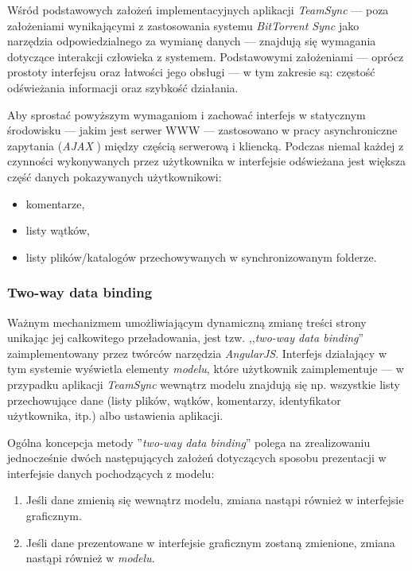 Wśród podstawowych założeń implementacyjnych aplikacji \emph{TeamSync} --- poza założeniami wynikającymi z zastosowania systemu \emph{BitTorrent Sync} jako narzędzia odpowiedzialnego za wymianę danych --- znajdują się wymagania dotyczące interakcji człowieka z systemem. Podstawowymi założeniami --- oprócz prostoty interfejsu oraz łatwości jego obsługi --- w tym zakresie są: częstość odświeżania informacji oraz szybkość działania.

Aby sprostać powyższym wymaganiom i zachować interfejs w statycznym środowisku --- jakim jest serwer WWW --- zastosowano w pracy asynchroniczne zapytania (\emph{AJAX} \cite{ajax}) między częścią serwerową i kliencką. Podczas niemal każdej z czynności wykonywanych przez użytkownika w interfejsie odświeżana jest większa część danych pokazywanych użytkownikowi:

\begin{itemize}[noitemsep]
  \item komentarze,
  \item listy wątków,
  \item listy plików/katalogów przechowywanych w synchronizowanym folderze.
\end{itemize}

\subsubsection*{Two-way data binding}

Ważnym mechanizmem umożliwiającym dynamiczną zmianę treści strony unikając jej całkowitego przeładowania, jest tzw. ,,\emph{two-way data binding}'' zaimplementowany przez twórców narzędzia \emph{AngularJS}. Interfejs działający w tym systemie wyświetla elementy \emph{modelu}, które użytkownik zaimplementuje --- w przypadku aplikacji \emph{TeamSync} wewnątrz modelu znajdują się np. wszystkie listy przechowujące dane (listy plików, wątków, komentarzy, identyfikator użytkownika, itp.) albo ustawienia aplikacji.

Ogólna koncepcja metody ''\emph{two-way data binding}'' polega na zrealizowaniu jednocześnie dwóch następujących założeń dotyczących sposobu prezentacji w interfejsie danych pochodzących z modelu:

\begin{enumerate}[noitemsep]
  \item Jeśli dane zmienią się wewnątrz modelu, zmiana nastąpi również w interfejsie graficznym.
  
  \item Jeśli dane prezentowane w interfejsie graficznym zostaną zmienione, zmiana nastąpi również w \emph{modelu}.
\end{enumerate}

